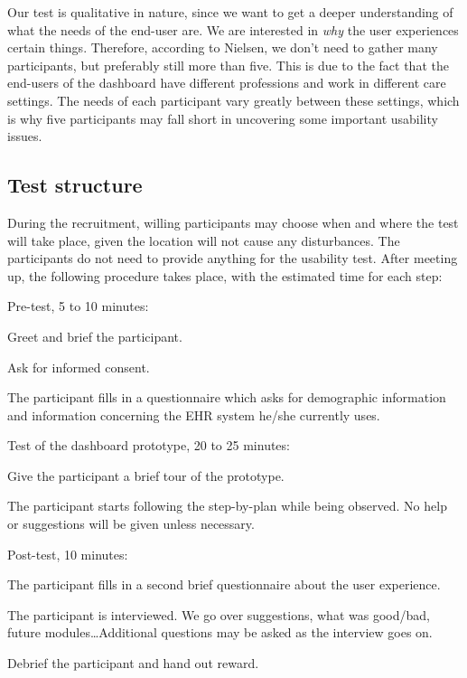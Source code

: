     Our test is qualitative in nature, since we want to get a deeper understanding of what the needs of the end-user are. We are interested in \emph{why} the user experiences certain things. Therefore, according to Nielsen, we don't need to gather many participants, but preferably still more than five. This is due to the fact that the end-users of the dashboard have different professions and work in different care settings. The needs of each participant vary greatly between these settings, which is why five participants may fall short in uncovering some important usability issues.

    \subsection{Test structure}

    During the recruitment, willing participants may choose when and where the test will take place, given the location will not cause any disturbances. The participants do not need to provide anything for the usability test. After meeting up, the following procedure takes place, with the estimated time for each step:
    \begin{myenumerate}
        \item Pre-test, 5 to 10 minutes:
        \begin{myenumerate}
            \item Greet and brief the participant.
            \item Ask for informed consent.
            \item The participant fills in a questionnaire which asks for demographic information and information concerning the EHR system he/she currently uses.
        \end{myenumerate}
        \item Test of the dashboard prototype, 20 to 25 minutes:
        \begin{myenumerate}
            \item Give the participant a brief tour of the prototype.
            \item The participant starts following the step-by-plan while being observed. No help or suggestions will be given unless necessary.
        \end{myenumerate}
        \item Post-test, 10 minutes:
        \begin{myenumerate}
            \item The participant fills in a second brief questionnaire about the user experience.
            \item The participant is interviewed. We go over suggestions, what was good/bad, future modules\ldots Additional questions may be asked as the interview goes on.
            \item Debrief the participant and hand out reward.
        \end{myenumerate}
    \end{myenumerate}

